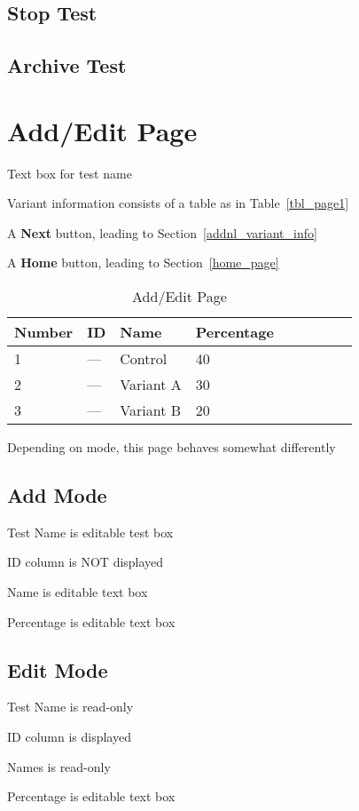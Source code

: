 \documentclass[letterpaper]{article}
\begin{document}
\subsection{Stop Test}
\label{stop_test}
\subsection{Archive Test}
\label{archive_test}

\section{Add/Edit Page}
\label{add_edit_page}
\be
\item Text box for test name 
\item Variant information consists of a table as in Table~\ref{tbl_page1}
\item A {\bf Next} button, leading to Section~\ref{addnl_variant_info}
\item A {\bf Home} button, leading to Section~\ref{home_page}
  \ee
\begin{table}[hb]
\centering
\begin{tabular}{|l||l|l|l|l|l|l|l|l|}  \hline \hline
  {\bf Number} &   {\bf ID} & {\bf Name} & {\bf Percentage} \\ \hline \hline
  1 & --- & Control & 40  \\ \hline
  2 & --- & Variant A & 30  \\ \hline
  3 & --- & Variant B & 20  \\ \hline
\hline
\end{tabular}
\caption{Add/Edit Page}
\label{tbl_page_1}
\end{table}
 Depending on mode, this page behaves somewhat differently
 \subsection{Add Mode}
 \label{page1_add_mode}
 \bi
 \item Test Name is editable test box 
 \item ID column is NOT displayed
 \item Name is editable text box
 \item Percentage is editable text box
   \ei
 \subsection{Edit Mode}
 \label{page1_edit_mode}
 \bi
 \item Test Name is read-only
 \item ID column is displayed
 \item Names is read-only
 \item Percentage is editable text box
   \ei
\end{document}
